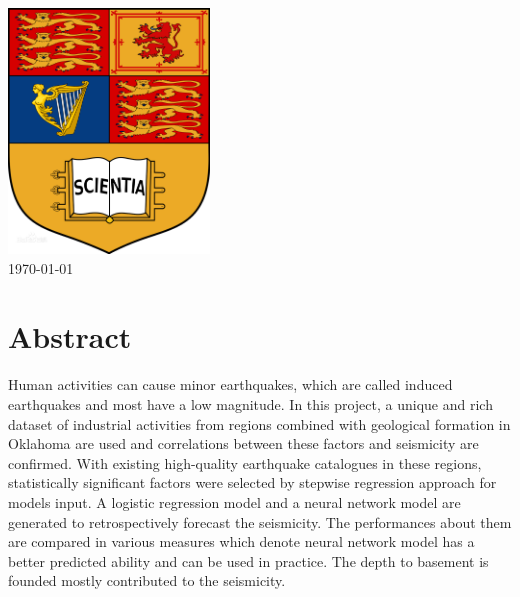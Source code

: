 \documentclass[final-report]{report-template}
\begin{document}
\begin{titlepage}

\includegraphics[width=0.4\textwidth]{school.png}\\[3cm] %
 



{\large \today}\\[1cm] %

\githubrepo  %
\vfill %

\end{titlepage}



\tableofcontents
\newpage

\section*{Abstract}
Human activities can cause minor earthquakes, which are called induced earthquakes and most have a low magnitude. 
In this project, a unique and rich dataset of industrial activities from regions combined with geological formation in Oklahoma are used and correlations between these factors and seismicity are confirmed.
With existing high-quality earthquake catalogues in these regions, statistically significant factors were selected by stepwise regression approach for models input.
A logistic regression model and a neural network model are generated to retrospectively forecast the seismicity. The performances about them are compared in various measures which denote neural network model has a better predicted ability and can be used in practice.
The depth to basement is founded mostly contributed to the seismicity.
\end{document}
